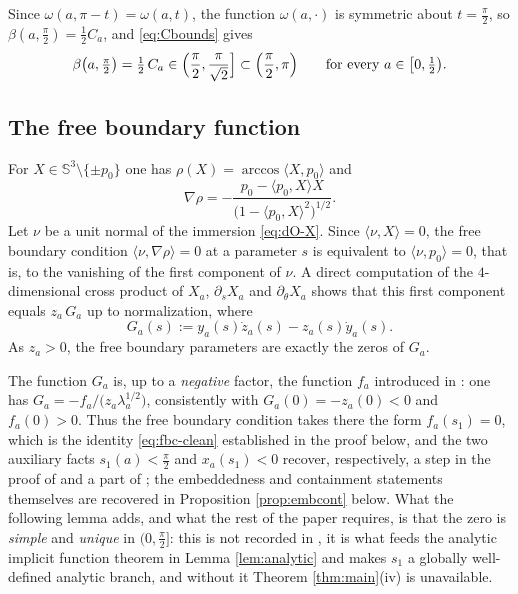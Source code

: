 \documentclass[10pt,a4paper]{amsart}
\newcommand{\Sph}{\mathbb{S}}
\begin{document}
Since $\omega(a,\pi-t)=\omega(a,t)$, the function $\omega(a,\cdot)$ is symmetric about $t=\tfrac\pi2$, so $\beta(a,\tfrac\pi2)=\tfrac12C_a$, and \eqref{eq:Cbounds} gives
\begin{equation}\label{eq:beta-half}
\beta\bigl(a,\tfrac\pi2\bigr)=\tfrac12\,C_a\in\Bigl(\frac\pi2,\frac{\pi}{\sqrt2}\Bigr]\subset\Bigl(\frac\pi2,\pi\Bigr)\qquad\text{for every }a\in\bigl[0,\tfrac12\bigr).
\end{equation}




\subsection*{The free boundary function}

For $X\in\Sph^3\setminus\{\pm p_0\}$ one has $\rho(X)=\arccos\langle X,p_0\rangle$ and
\[
\nabla\rho=-\frac{p_0-\langle p_0,X\rangle X}{\bigl(1-\langle p_0,X\rangle^2\bigr)^{1/2}} .
\]
Let $\nu$ be a unit normal of the immersion \eqref{eq:dO-X}. Since $\langle\nu,X\rangle=0$, the free boundary condition $\langle\nu,\nabla\rho\rangle=0$ at a parameter $s$ is equivalent to $\langle\nu,p_0\rangle=0$, that is, to the vanishing of the first component of $\nu$. A direct computation of the $4$-dimensional cross product of $X_a$, $\partial_sX_a$ and $\partial_\theta X_a$ shows that this first component equals $z_a\,G_a$ up to normalization, where
\begin{equation}\label{eq:Ga}
G_a(s):=y_a(s)\dot z_a(s)-z_a(s)\dot y_a(s).
\end{equation}
As $z_a>0$, the free boundary parameters are exactly the zeros of $G_a$.

The function $G_a$ is, up to a \emph{negative} factor, the function $f_a$ introduced in \cite[Lem. 3.1]{dO24}: one has $G_a=-f_a/\bigl(z_a\lambda_a^{1/2}\bigr)$, consistently with $G_a(0)=-z_a(0)<0$ and $f_a(0)>0$. Thus the free boundary condition takes there the form $f_a(s_1)=0$, which is the identity \eqref{eq:fbc-clean} established in the proof below, and the two auxiliary facts $s_1(a)<\tfrac\pi2$ and $x_a(s_1)<0$ recover, respectively, a step in the proof of \cite[Prop. 3.3]{dO24} and a part of \cite[Prop. 3.4]{dO24}; the embeddedness and containment statements themselves are recovered in Proposition \ref{prop:embcont} below. What the following lemma adds, and what the rest of the paper requires, is that the zero is \emph{simple} and \emph{unique} in $(0,\tfrac\pi2]$: this is not recorded in \cite{dO24}, it is what feeds the analytic implicit function theorem in Lemma \ref{lem:analytic} and makes $s_1$ a globally well-defined analytic branch, and without it Theorem \ref{thm:main}(iv) is unavailable.
\end{document}
